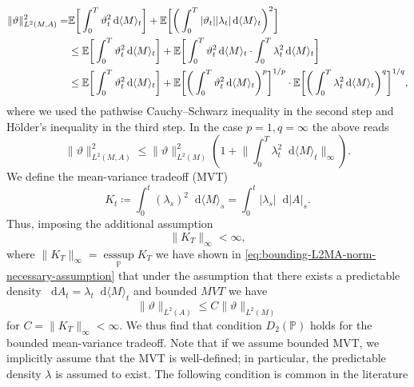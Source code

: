 \documentclass[11pt,a4paper,twoside,openany]{report}
\newcommand{\diff}{\mathop{}\!\mathrm{d}}
\theoremstyle{plain} %
\theoremstyle{definition} %
\theoremstyle{remark} %
\begin{document}
\begin{align}\label{eq:bounding-L2MA-norm-necessary-assumption}
\lVert \vartheta\rVert_{L^2(M,A)}^2
 =&\mathbb{E}\bigg[\int_0^T \vartheta_t^2\diff \langle M\rangle_t\bigg]
 +\mathbb{E}\bigg[\bigg(\int_0^T |\vartheta_t||\lambda_t|\diff\langle M\rangle_t\bigg)^2\bigg]\\
&\leq\mathbb{E}\bigg[\int_0^T \vartheta_t^2\diff \langle M\rangle_t\bigg]
 +\mathbb{E}\bigg[\int_0^{T}\vartheta_t^2\diff \langle M\rangle_t\cdot\int_0^{T}\lambda_t^2\diff \langle M\rangle_t\bigg]\notag \\
&\leq\mathbb{E}\bigg[\int_0^T \vartheta_t^2\diff \langle M\rangle_t\bigg]
 +\mathbb{E}\bigg[\bigg(\int_0^{T}\vartheta_t^2\diff \langle M\rangle_t\bigg)^{p}\bigg]^{1/p}\cdot\mathbb{E}\bigg[\bigg(\int_0^{T}\lambda_t^2\diff \langle M\rangle_t\bigg)^{q}\bigg]^{1/q}\notag 
,
\end{align}
where we used the pathwise Cauchy--Schwarz inequality in the second step and Hölder's inequality in the third step. In the case \(p=1,q=\infty\) the above reads
\begin{equation}
    \lVert \vartheta\rVert_{L^2(M,A)}^2\leq\lVert \vartheta\rVert_{L^2(M)}^2\left(1+\lVert\int_0^{T}\lambda_t^2\diff \langle M\rangle_t\rVert_{\infty}\right).
\end{equation}
We define the mean-variance tradeoff (MVT)  
\begin{equation}
    K_t\coloneqq\int_0^{t}(\lambda_s)^2\diff \langle M\rangle_s=\int_0^{t}|\lambda_s|\diff |A|_s.
\end{equation}
Thus, imposing the additional assumption
\begin{equation}
    \lVert K_{T}\rVert_{\infty}<\infty,
\end{equation}
where \(\lVert K_{T}\rVert_{\infty} = \underset{\mathbb{P}}{\operatorname*{ess\sup}}K_{T}\) we have shown in \cref{eq:bounding-L2MA-norm-necessary-assumption} that under the assumption that there exists a predictable density \(\diff A_t=\lambda_t\diff\langle M\rangle_t\) and bounded \(MVT\) we have
\begin{equation}
    \lVert \vartheta\rVert_{L^2(A)}\leq C\lVert \vartheta\rVert_{L^2(M)}
\end{equation} 
for \(C=\lVert K_{T}\rVert_{\infty}<\infty\). 
We thus find that condition \(D_2(\mathbb{P})\) holds for the bounded mean-variance tradeoff. Note that if we assume bounded MVT, we implicitly assume that the MVT is well-defined; in particular, the predictable density \(\lambda\) is assumed to exist.  The following condition is common in the literature
\end{document}
